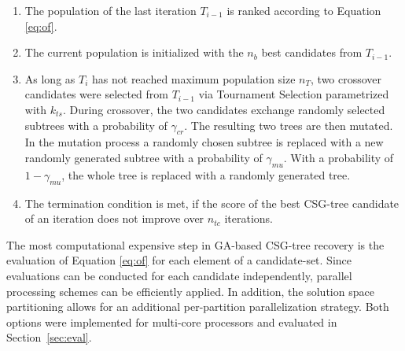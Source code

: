 \begin{enumerate}
\item The population of the last iteration $T_{i-1}$ is ranked according to Equation \ref{eq:of}.
\item The current population is initialized with the $n_b$ best candidates from $T_{i-1}$.
\item As long as $T_i$ has not reached maximum population size $n_T$, two crossover candidates were selected from $T_{i-1}$ via Tournament Selection \cite{miller95genetic} parametrized with $k_{ts}$.
During crossover, the two candidates exchange randomly selected subtrees with a probability of $\gamma_{cr}$.
The resulting two trees are then mutated. 
In the mutation process a randomly chosen subtree is replaced with a new randomly generated subtree with a probability of $\gamma_{mu}$.
With a probability of $1-\gamma_{mu}$, the whole tree is replaced with a randomly generated tree.
\item The termination condition is met, if the score of the best \ac{CSG}-tree candidate of an iteration does not improve over $n_{tc}$ iterations.  	 
\end{enumerate}  
The most computational expensive step in \ac{GA}-based \ac{CSG}-tree recovery is the evaluation of Equation \ref{eq:of} for each element of a candidate-set. 
Since evaluations can be conducted for each candidate independently, parallel processing schemes can be efficiently applied.  
In addition, the solution space partitioning allows for an additional per-partition parallelization strategy.
Both options were implemented for multi-core processors and evaluated in Section~\ref{sec:eval}.

